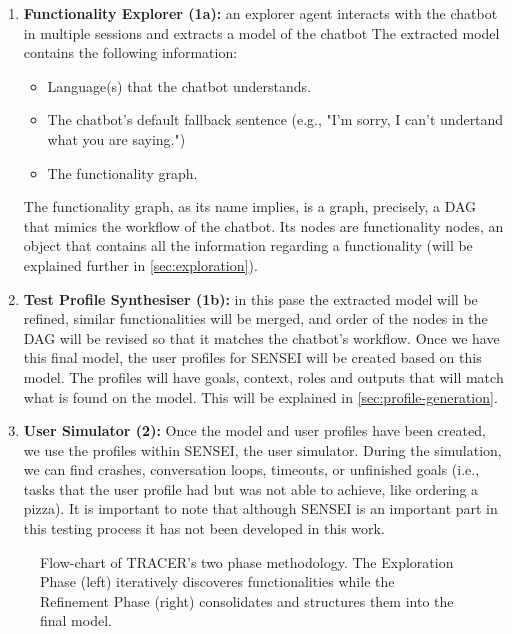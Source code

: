 \begin{enumerate}
  \item \textbf{Functionality Explorer (1a):}
    an explorer agent interacts with the chatbot in multiple sessions
    and extracts a model of the chatbot
    The extracted model contains the following information:
    \begin{itemize}
      \item Language(s) that the chatbot understands.
      \item The chatbot's default fallback sentence (e.g., "I'm sorry, I can't undertand what you are saying.")
      \item The functionality graph.
    \end{itemize}

    The functionality graph, as its name implies,
    is a graph, precisely, a \ac{DAG}
    that mimics the workflow of the chatbot.
    Its nodes are functionality nodes,
    an object that contains all the information regarding a functionality
    (will be explained further in 
    \autoref{sec:exploration}).

  \item \textbf{Test Profile Synthesiser (1b):}
    in this pase the extracted model will be refined,
    similar functionalities will be merged,
    and order of the nodes in the \ac{DAG} will be revised
    so that it matches the chatbot's workflow.
    Once we have this final model,
    the user profiles for SENSEI will be created based on this model.
    The profiles will have goals, context, roles and outputs
    that will match what is found on the model.
    This will be explained in \autoref{sec:profile-generation}.

  \item \textbf{User Simulator (2):}
    Once the model and user profiles have been created,
    we use the profiles within SENSEI, the user simulator.
    During the simulation,
    we can find crashes, conversation loops, timeouts,
    or unfinished goals (i.e., tasks that the user profile had
    but was not able to achieve, like ordering a pizza).
    It is important to note that
    although SENSEI is an important part in this testing process
    it has not been developed in this work.
\end{enumerate}


\begin{figure}[!htbp]
    \centering
    
    \caption{Flow-chart of TRACER's two phase methodology.
    The Exploration Phase (left) iteratively discoveres functionalities
    while the Refinement Phase (right) consolidates and structures them into the final model.}
    \label{fig:flowchart-tracer}
\end{figure}

